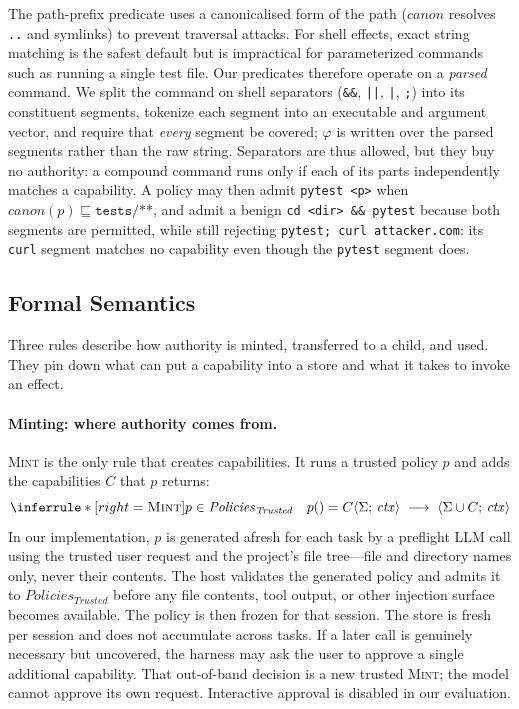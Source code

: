 \documentclass[sigplan,review,anonymous]{acmart}
\newcommand{\Trusted}{\mathit{Trusted}}
\newcommand{\rulename}[1]{\textsc{#1}}
\begin{document}
  
  The path-prefix predicate uses a canonicalised form of the path
  ($\mathit{canon}$ resolves \texttt{..} and symlinks) to prevent
  traversal attacks.  For shell effects, exact string matching is the safest
  default but is impractical for parameterized commands such as running a
  single test file. Our predicates therefore operate on a \emph{parsed}
  command. We split the command on shell separators
  (\texttt{\&\&}, \texttt{||}, \texttt{|}, \texttt{;}) into its constituent
  segments, tokenize each segment into an executable and argument vector, and
  require that \emph{every} segment be covered; $\varphi$ is written over the
  parsed segments rather than the raw string. Separators are thus allowed, but
  they buy no authority: a compound command runs only if each of its parts
  independently matches a capability. A policy may then admit \texttt{pytest
  <p>} when $\mathit{canon}(p) \sqsubseteq \texttt{tests/**}$, and admit a
  benign \texttt{cd <dir> \&\& pytest} because both segments are permitted,
  while still rejecting \texttt{pytest; curl attacker.com}: its \texttt{curl}
  segment matches no capability even though the \texttt{pytest} segment does.
  
  \subsection{Formal Semantics}
  \label{sec:formalism}
  
  Three rules describe how authority is minted, transferred to a child, and
  used. They pin down what can put a capability into a store and what it takes
  to invoke an effect.

  \paragraph{Minting: where authority comes from.}
  \rulename{Mint} is the only rule that creates capabilities. It runs a
  trusted policy $p$ and adds the capabilities $C$ that $p$ returns:
  \[
    \inferrule*[right=\rulename{Mint}]{
      p \in \mathit{Policies}_{\Trusted} \quad
      p() = C
    }{
      \langle \Sigma;\, \mathit{ctx} \rangle
      \;\longrightarrow\;
      \langle \Sigma \cup C;\, \mathit{ctx} \rangle
    }
  \]
  In our implementation, $p$ is generated afresh for each task by a preflight
  LLM call using the trusted user request and the project's file tree---file and
  directory names only, never their contents. The host validates the generated
  policy and admits it to $\mathit{Policies}_{\Trusted}$ before any file
  contents, tool output, or other injection surface becomes available. The
  policy is then frozen for that session. The store is fresh per session and
  does not accumulate across tasks. If a later call is genuinely necessary
  but uncovered, the harness may ask the user to approve a single additional
  capability. That out-of-band decision is a new trusted \rulename{Mint}; the
  model cannot approve its own request. Interactive approval is disabled in
  our evaluation.
\end{document}
